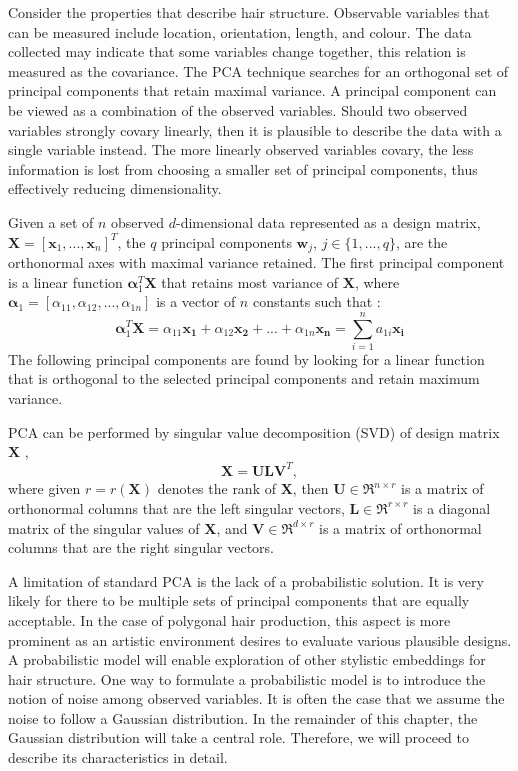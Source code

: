 \documentclass[ %
author={Dillon Keith Diep},
supervisor={Dr. Carl Henrik Ek},
degree={MEng},
title={ART-CG Hair:},
subtitle={Assisted Real-time Content Generation of Stylised Virtual Hair},
type={Research},
year={2017} ]{dissertation}
\begin{document}
Consider the properties that describe hair structure. Observable variables that can be measured include location, orientation, length, and colour. The data collected may indicate that some variables change together, this relation is measured as the covariance. The PCA technique searches for an orthogonal set of principal components that retain maximal variance. A principal component can be viewed as a combination of the observed variables. Should two observed variables strongly covary linearly, then it is plausible to describe the data with a single variable instead. The more linearly observed variables covary, the less information is lost from choosing a smaller set of principal components, thus effectively reducing dimensionality.

Given a set of $n$ observed $d$-dimensional data represented as a design matrix, $\bm{X}=[\bm{x}_1,...,\bm{x}_n]^T$, the $q$ principal components $\bm{w}_j$, $j \in \{1,...,q\}$, are the orthonormal axes with maximal variance retained. The first principal component is a linear function $\bm{\alpha}^T_1\bm{X}$ that retains most variance of $\bm{X}$, where $\bm{\alpha}_1 = [\alpha_{11}, \alpha_{12}, ..., \alpha_{1n}]$ is a vector of $n$ constants such that \cite[p.4]{pca2002}:
$$\bm{\alpha}^T_1\bm{X}=\alpha_{11}\bm{x_1}+\alpha_{12}\bm{x_2}+...+\alpha_{1n}\bm{x_n} = \sum^n_{i=1}a_{1i}\bm{x_i}$$
The following principal components are found by looking for a linear function that is orthogonal to the selected principal components and retain maximum variance.

PCA can be performed by singular value decomposition (SVD) of design matrix $\bm{X}$ \cite[pp.44-46]{pca2002},
$$\bm{X=ULV}^T,$$
where given $r = r(\bm{X})$ denotes the rank of $\bm{X}$, then
$\bm{U} \in \Re^{n \times r}$ is a matrix of orthonormal columns that are the left singular vectors,
$\bm{L} \in \Re^{r \times r}$ is a diagonal matrix of the singular values of $\bm{X}$, and
$\bm{V} \in \Re^{d \times r}$ is a matrix of orthonormal columns that are the right singular vectors.

A limitation of standard PCA is the lack of a probabilistic solution. 
It is very likely for there to be multiple sets of principal components that are equally acceptable. In the case of polygonal hair production, this aspect is more prominent as an artistic environment desires to evaluate various plausible designs. A probabilistic model will enable exploration of other stylistic embeddings for hair structure. One way to formulate a probabilistic model is to introduce the notion of noise among observed variables. It is often the case that we assume the noise to follow a Gaussian distribution. In the remainder of this chapter, the Gaussian distribution will take a central role. Therefore, we will proceed to describe its characteristics in detail.
\end{document}

